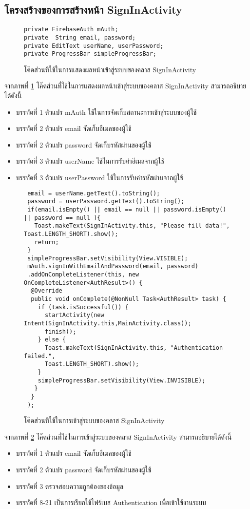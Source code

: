 {	\subsection{โครงสร้างของการสร้างหน้า SignInActivity}
	\begin{figure}[H]
		{\begin{lstlisting}
private FirebaseAuth mAuth;
private  String email, password;
private EditText userName, userPassword;
private ProgressBar simpleProgressBar;
			\end{lstlisting}}
		\caption{โค๊ดส่วนที่ใช้ในการแสดงผลหน้าเข้าสู่ระบบของคลาส SignInActivity}
		\label{Fig:SignInActivity}
	\end{figure}
	จากภาพที่ \ref{Fig:SignInActivity} โค๊ดส่วนที่ใช้ในการแสดงผลหน้าเข้าสู่ระบบของคลาส SignInActivity สามารถอธิบายได้ดังนี้
	\begin{itemize}[label={--}]
		\item บรรทัดที่ 1 ตัวแปร mAuth ใช้ในการจัดเก็บสถานะการเข้าสู่ระบบของผู้ใช้
		\item บรรทัดที่ 2 ตัวแปร email จัดเก็บอีเมลของผู้ใช้
		\item บรรทัดที่ 2 ตัวแปร password จัดเก็บรหัสผ่านของผู้ใช้
		\item บรรทัดที่ 3 ตัวแปร userName ใช้ในการรับค่าอีเมลจากผู้ใช้
		\item บรรทัดที่ 3 ตัวแปร userPassword ใช้ในการรับค่ารหัสผ่านจากผู้ใช้   
	\end{itemize}
	\begin{figure}[H]
		{\begin{lstlisting}
 email = userName.getText().toString();
 password = userPassword.getText().toString();
 if(email.isEmpty() || email == null || password.isEmpty() || password == null ){
   Toast.makeText(SignInActivity.this, "Please fill data!", Toast.LENGTH_SHORT).show();
   return;
 }
 simpleProgressBar.setVisibility(View.VISIBLE);
 mAuth.signInWithEmailAndPassword(email, password)
 .addOnCompleteListener(this, new OnCompleteListener<AuthResult>() {
  @Override
  public void onComplete(@NonNull Task<AuthResult> task) {
    if (task.isSuccessful()) {
      startActivity(new Intent(SignInActivity.this,MainActivity.class));
      finish();
    } else {
      Toast.makeText(SignInActivity.this, "Authentication failed.",
      Toast.LENGTH_SHORT).show();
    }
    simpleProgressBar.setVisibility(View.INVISIBLE);
   }
  }
 );
			\end{lstlisting}}
		\caption{โค๊ดส่วนที่ใช้ในการเข้าสู่ระบบของคลาส SignInActivity}
		\label{Fig:SignInActivity2}
	\end{figure}
	จากภาพที่ \ref{Fig:SignInActivity2} โค๊ดส่วนที่ใช้ในการเข้าสู่ระบบของคลาส SignInActivity สามารถอธิบายได้ดังนี้
	\begin{itemize}[label={--}]
		\item บรรทัดที่ 1 ตัวแปร email จัดเก็บอีเมลของผู้ใช้
		\item บรรทัดที่ 2 ตัวแปร password จัดเก็บรหัสผ่านของผู้ใช้
		\item บรรทัดที่ 3 ตรวจสอบความถูกต้องของข้อมูล
		\item บรรทัดที่ 8-21 เป็นการเรียกใช้ไฟร์เบส Authentication เพื่อเข้าใช้งานระบบ   
	\end{itemize}
	
}
